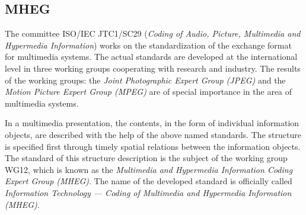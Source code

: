 %	
%	

\subsection{MHEG}
The committee ISO/IEC JTC1/SC29 (\textit{Coding of Audio, Picture, Multimedia and Hypermedia Information}) works on the standardization of the exchange format for multimedia systems. The actual standards are developed at the international level in three working groups cooperating with research and industry. The results of the working groups: the \textit{Joint Photographic Expert Group (JPEG)} and the \textit{Motion Picture Expert Group (MPEG)} are of special importance in the area of multimedia systems.

In a multimedia presentation, the contents, in the form of individual information objects, are described with the help of the above named standards. The structure is specified first through timely spatial relations between the information objects. The standard of this structure description is the subject of the working group WG12, which is known as the \textit{Multimedia and Hypermedia Information Coding Expert Group (MHEG)}. The name of the developed standard is officially called \textit{Information Technology — Coding of Multimedia and Hypermedia Information (MHEG)}. 


